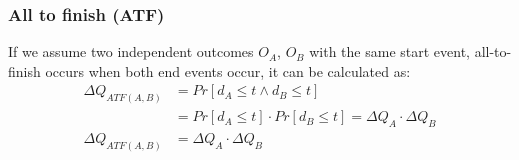     \subsubsection{All to finish (ATF)}
        If we assume two independent outcomes $O_A$, $O_B$ with the same start event, all-to-finish occurs when both end events occur, it can be calculated as:
        \begin{equation}
            \begin{split}
                \Delta Q_{ATF(A, B)} &= Pr[d_A \le t \wedge d_B \le t] \\
                & = Pr[d_A \le t] \cdot Pr[d_B \le t] = \Delta Q_A \cdot \Delta Q_B \\
                \Delta Q_{ATF(A, B)} &= \Delta Q_A \cdot \Delta Q_B 
            \end{split}
            \label{eq:atf}
        \end{equation}
        
